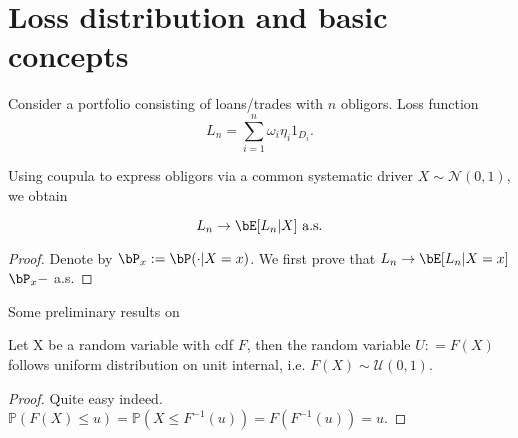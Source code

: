 \section{Loss distribution and basic concepts}
Consider a portfolio consisting of loans/trades with $n$ obligors. Loss function
\begin{equation}
L_n = \sum_{i=1}^{n}\omega_i \eta_i 1_{D_i}.
\end{equation} 

Using coupula to express obligors via a common systematic driver $X\sim\mathcal{N}(0,1)$, we obtain 
\begin{lem}
	\begin{equation}
	L_n \rightarrow \bE[L_n |X] \text{ a.s.}
	\end{equation}
\end{lem}
\begin{proof}
	Denote by $\bP_x: = \bP(\cdot|X=x)$. We first prove that $L_n \rightarrow \bE[L_n|X=x]$ $\bP_x-$ a.s.
\end{proof}

Some preliminary results on

\begin{lem}
	Let X be a random variable with cdf $F$, then the random variable $U: = F(X)$ follows uniform distribution on unit internal, i.e. $F(X) \sim \mathcal{U}(0,1)$.
\end{lem}
\begin{proof}
	Quite easy indeed. $\mathbb{P}(F(X)\le u) = \mathbb{P}(X\le F^{-1}(u)) = F(F^{-1}(u)) =u$.
\end{proof}